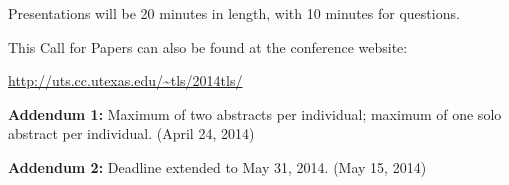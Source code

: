 \documentclass[11pt]{article}
\begin{document}
\medskip\noindent
Presentations will be 20 minutes in length, with 10 minutes for questions.

\medskip\noindent
This Call for Papers can also be found at the conference website:

\medskip
\url{http://uts.cc.utexas.edu/~tls/2014tls/}

\medskip
\noindent
\textbf{Addendum 1:}
  Maximum of two abstracts per individual; maximum of one solo abstract per individual.
  (April 24, 2014)

\noindent
\textbf{Addendum 2:}
  Deadline extended to May 31, 2014.
  (May 15, 2014)
\end{document}
